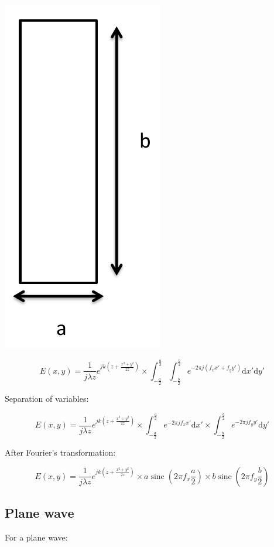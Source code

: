 \documentclass[10pt,a4paper]{article}
\DeclareMathOperator{\sinc}{sinc}
\begin{document}
\begin{center}
\includegraphics[scale=0.3]{../Ressources/schema-4-1.png}
\end{center}

\[
E(x,y)=\frac{1}{j\lambda z} e^{jk\left(z+\frac{x^2+y^2}{2z}\right)}
\times \int_{-\frac{a}{2}}^\frac{a}{2} \int_{-\frac{b}{2}}^\frac{b}{2}
 e^{-2\pi j(f_xx'+f_yy')}\mathrm{d}x'\mathrm{d}y'
\]

Separation of variables:

\[
E(x,y)=\frac{1}{j\lambda z} e^{jk\left(z+\frac{x^2+y^2}{2z}\right)}
\times \int_{-\frac{a}{2}}^\frac{a}{2} e^{-2\pi jf_xx'}\mathrm{d}x'
\times \int_{-\frac{b}{2}}^\frac{b}{2} e^{-2\pi jf_yy'}\mathrm{d}y'
\]

After Fourier’s transformation:

\[
E(x,y)=\frac{1}{j\lambda z} e^{jk\left(z+\frac{x^2+y^2}{2z}\right)}
\times a\sinc\left(2\pi f_x \frac{a}{2}\right)
\times b\sinc\left(2\pi f_y \frac{b}{2}\right)
\]

	\subsection{Plane wave}
For a plane wave:
\end{document}
